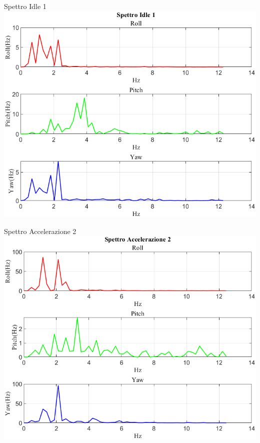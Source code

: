 \documentclass[beamer]{standalone}
\begin{document}
	\begin{frame}{{Spettro Idle 1}}
		\centering\includegraphics[height=.8\textheight]{figure/VAng/Trasformata/Spettro Idle 1}
	\end{frame}
	
	\begin{frame}{{Spettro Accelerazione 2}}
		\centering\includegraphics[height=.8\textheight]{figure/VAng/Trasformata/Spettro Accelerazione 2}
	\end{frame}
	
\end{document}
